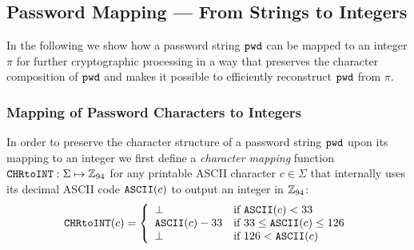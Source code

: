 \subsection{Password Mapping --- From Strings to Integers}\label{sec:pwdencoding}
In the following we show how a password string $\mathtt{pwd}$ can be mapped to an integer $\pi$ for further cryptographic processing in a way that preserves the character composition of $\mathtt{pwd}$ and makes it possible to efficiently reconstruct $\mathtt{pwd}$ from $\pi$. 


\subsubsection{Mapping of Password Characters to Integers}
In order to preserve the character structure of a password string $\mathtt{pwd}$ upon its mapping to an integer we first define a \emph{character mapping} function $\texttt{CHRtoINT}:\Sigma\mapsto\mathbb{Z}_{94}$ for any printable \ac{ASCII}  character $c\in\Sigma$ that internally uses its decimal \ac{ASCII}  code $\mathtt{ASCII}(c)$ to output an integer in $\mathbb{Z}_{94}$:
\[
\texttt{CHRtoINT}(c) =
\left\{
	\begin{array}{ll}
		\bot  & \mbox{if } \mathtt{ASCII}(c) < 33 \\
		\mathtt{ASCII}(c)-33 & \mbox{if } 33 \leq \mathtt{ASCII}(c) \leq 126 \\
		\bot & \mbox{if } 126 < \mathtt{ASCII}(c)
	\end{array}
\right.
\]


